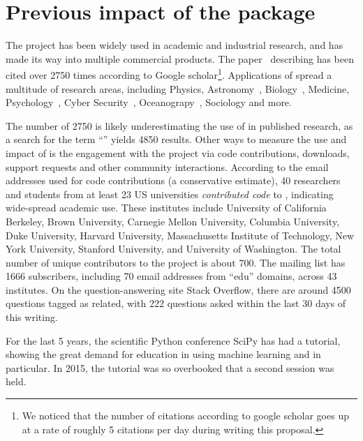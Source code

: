 \section{Previous impact of the \sklearn{} package}
The \sklearn{} project has been widely used in academic and industrial research,
and has made its way into multiple commercial products. The
paper~\autocite{pedregosa2011scikit} describing \sklearn{} has been cited over 2750 times
according to Google scholar\footnote{We noticed that the number of citations
according to google scholar goes up at a rate of roughly 5 citations per day
during writing this proposal.}. Applications of \sklearn{} spread
a multitude of research areas, including Physics, Astronomy~\autocite{pereira2013spectrophotometric, bennett20141},
Biology~\autocite{misof2014phylogenomics, ritchie2014functional}, Medicine,
Psychology~\autocite{park2015automatic,doehrmann2013predicting}, Cyber
Security~\autocite{sahs2012machine},
Oceanograpy~\autocite{sunagawa2015structure}, Sociology and more.

The number of 2750 is likely underestimating the use of \sklearn{} in published
research, as a search for the term ``\sklearn{}'' yields 4850 results.
Other ways to measure the use and impact of \sklearn{} is the engagement with
the project via code contributions, downloads, support requests and other
community interactions.
According to the email addresses used for code contributions (a conservative
estimate), 40 researchers and students from at least 23 US universities
\emph{contributed code} to \sklearn{}, indicating wide-spread academic use.
These institutes include University of California Berkeley, Brown University,
Carnegie Mellon University, Columbia University, Duke University, Harvard
University, Massachusetts Institute of Technology, New York University,
Stanford University, and University of Washington.
The total number of unique contributors to the project is about 700.
%
The \sklearn{} mailing list has 1666 subscribers, including 70 email
addresses from ``edu'' domains, across 43 institutes.
%
On the question-answering site Stack Overflow, there are around 4500 questions
tagged as \sklearn{} related, with 222 questions asked within the last 30
days of this writing.

For the last 5 years, the scientific Python conference SciPy has had a \sklearn{} tutorial,
showing the great demand for education in using machine learning and \sklearn{} in particular.
In 2015, the tutorial was so overbooked that a second session was held.

